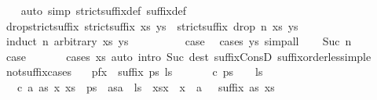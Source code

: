 \begin{isabellebody}
%
\isadelimproof
\ \ %
\endisadelimproof
%
\isatagproof
{}\isamarkupfalse%
\ {\isacharparenleft}auto\ simp{\isacharcolon}\ strict{\isacharunderscore}suffix{\isacharunderscore}def\ suffix{\isacharunderscore}def{\isacharparenright}%
\endisatagproof
{\isafoldproof}%
%
\isadelimproof
\isanewline
%
\endisadelimproof
\isanewline
{}\isamarkupfalse%
\ drop{\isacharunderscore}strict{\isacharunderscore}suffix{\isacharcolon}\ {\isachardoublequoteopen}strict{\isacharunderscore}suffix\ xs\ ys\ {\isasymLongrightarrow}\ strict{\isacharunderscore}suffix\ {\isacharparenleft}drop\ n\ xs{\isacharparenright}\ ys{\isachardoublequoteclose}\isanewline
%
\isadelimproof
%
\endisadelimproof
%
\isatagproof
{}\isamarkupfalse%
\ {\isacharparenleft}induct\ n\ arbitrary{\isacharcolon}\ xs\ ys{\isacharparenright}\isanewline
\ \ \isamarkupfalse%
\ {}\isanewline
\ \ \isamarkupfalse%
\ \isamarkupfalse%
\ {\isacharquery}case\ \isamarkupfalse%
\ {\isacharparenleft}cases\ ys{\isacharparenright}\ simp{\isacharunderscore}all\isanewline
{}\isamarkupfalse%
\isanewline
\ \ \isamarkupfalse%
\ {\isacharparenleft}Suc\ n{\isacharparenright}\isanewline
\ \ \isamarkupfalse%
\ \isamarkupfalse%
\ {\isacharquery}case\ \isanewline
\ \ \ \ \isamarkupfalse%
\ {\isacharparenleft}cases\ xs{\isacharparenright}\ {\isacharparenleft}auto\ intro{\isacharcolon}\ Suc\ dest{\isacharcolon}\ suffix{\isacharunderscore}ConsD{\isacharprime}\ suffix{\isacharunderscore}order{\isachardot}less{\isacharunderscore}imp{\isacharunderscore}le{\isacharparenright}\isanewline
{}\isamarkupfalse%
%
\endisatagproof
{\isafoldproof}%
%
\isadelimproof
\isanewline
%
\endisadelimproof
\isanewline
{}\isamarkupfalse%
\ not{\isacharunderscore}suffix{\isacharunderscore}cases{\isacharcolon}\isanewline
\ \ \ pfx{\isacharcolon}\ {\isachardoublequoteopen}{\isasymnot}\ suffix\ ps\ ls{\isachardoublequoteclose}\isanewline
\ \ \isanewline
\ \ \ \ {\isacharparenleft}c{}{\isacharparenright}\ {\isachardoublequoteopen}ps\ {\isasymnoteq}\ {\isacharbrackleft}{\isacharbrackright}{\isachardoublequoteclose}\ \ {\isachardoublequoteopen}ls\ {\isacharequal}\ {\isacharbrackleft}{\isacharbrackright}{\isachardoublequoteclose}\isanewline
\ \ {\isacharbar}\ {\isacharparenleft}c{}{\isacharparenright}\ a\ as\ x\ xs\ \ {\isachardoublequoteopen}ps\ {\isacharequal}\ as{\isacharat}{\isacharbrackleft}a{\isacharbrackright}{\isachardoublequoteclose}\ \ {\isachardoublequoteopen}ls\ {\isacharequal}\ xs{\isacharat}{\isacharbrackleft}x{\isacharbrackright}{\isachardoublequoteclose}\ \ {\isachardoublequoteopen}x\ {\isacharequal}\ a{\isachardoublequoteclose}\ \ {\isachardoublequoteopen}{\isasymnot}\ suffix\ as\ xs{\isachardoublequoteclose}\isanewline

\end{isabellebody}
